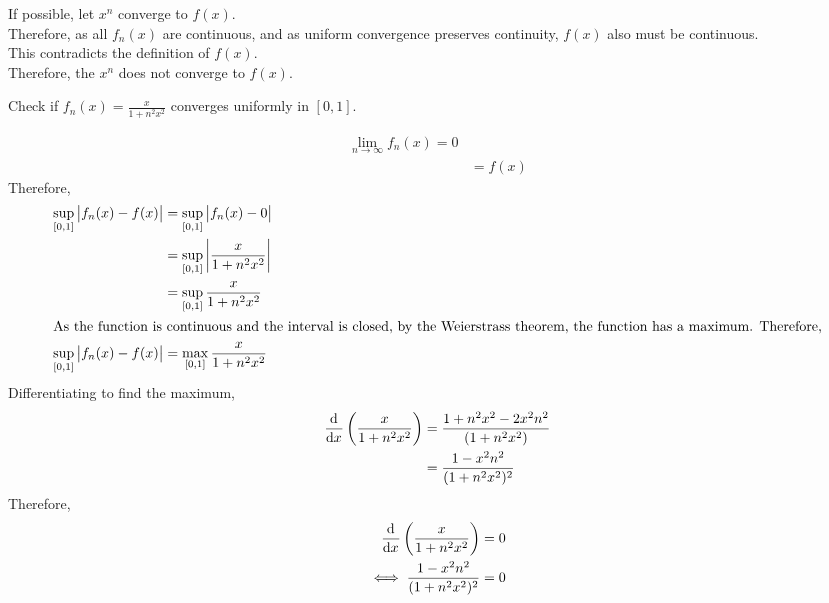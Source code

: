 \documentclass[fleqn, a4paper, 12pt, twoside]{article}
\theoremstyle{definition}
\theoremstyle{theorem}
\begin{document}
\begin{solution}
	If possible, let $x^n$ converge to $f(x)$.\\
	Therefore, as all $f_n(x)$ are continuous, and as uniform convergence preserves continuity, $f(x)$ also must be continuous.\\
	This contradicts the definition of $f(x)$.\\
	Therefore, the $x^n$ does not converge to $f(x)$.
\end{solution}

\begin{question}
	Check if $f_n(x) = \frac{x}{1 + n^2 x^2}$ converges uniformly in $[0,1]$.
\end{question}

\begin{solution}
	\begin{align*}
		\lim\limits_{n \to \infty} f_n(x) = 0 \\
                                                       & = f(x)
	\end{align*}
	Therefore,
	\begin{align*}
		\sup\limits_{[0,1]} \left| f_n(x) - f(x) \right| & = \sup\limits_{[0,1]} \left| f_n(x) - 0 \right|            \\
                                                                 & = \sup\limits_{[0,1]} \left| \frac{x}{1 + n^2 x^2} \right| \\
                                                                 & = \sup\limits_{[0,1]} \frac{x}{1 + n^2 x^2}                \\
		\intertext{As the function is continuous and the interval is closed, by the Weierstrass theorem, the function has a maximum. Therefore,}
		\sup\limits_{[0,1]} \left| f_n(x) - f(x) \right| & = \max\limits_{[0,1]} \frac{x}{1 + n^2 x^2}
	\end{align*}
	Differentiating to find the maximum,
	\begin{align*}
		\dod{}{x} \left( \frac{x}{1 + n^2 x^2} \right) & = \frac{1 + n^2 x^2 - 2 x^2 n^2}{(1 + n^2 x^2)} \\
                                                               & = \frac{1 - x^2 n^2}{(1 + n^2 x^2)^2}
	\end{align*}
	Therefore,
	\begin{align*}
		\dod{}{x} \left( \frac{x}{1 + n^2 x^2} \right) & = 0       \\
		\iff \frac{1 - x^2 n^2}{(1 + n^2 x^2)^2}       & = 0       \\

\end{align*}
\end{solution}
\end{document}
